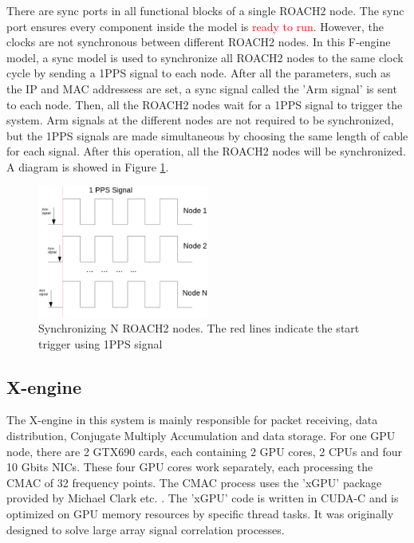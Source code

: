 \documentclass{ws-jai}
\begin{document}
        There are sync ports in all functional blocks of a single ROACH2 node. The sync port ensures every component inside the model is \textcolor{red}{ready to run}. However, the clocks are not synchronous between different ROACH2 nodes. In this F-engine model, a sync model is used to synchronize all ROACH2 nodes to the same clock cycle by sending a 1PPS signal to each node. After all the parameters, such as the IP and MAC addressess are set, a sync signal called the 'Arm signal' is sent to each node. Then, all the ROACH2 nodes wait for a 1PPS signal to trigger the system. Arm signals at the different nodes are not required to be synchronized, but the 1PPS signals are made simultaneous by choosing the same length of cable for each signal. After this operation, all the ROACH2 nodes will be synchronized. A diagram is showed in Figure \ref{fig:1pps}.
\begin{figure}[t]
 \centering
 \includegraphics[width=0.5\textwidth]{./picture/1pps_sync.eps}
\caption{Synchronizing N ROACH2 nodes. The red lines indicate the start trigger using 1PPS signal\label{fig:1pps}}
\end{figure}


\subsection{X-engine}\label{sec:X-engine}

The X-engine in this system is mainly responsible for packet receiving, data distribution, Conjugate Multiply Accumulation and data storage. For one GPU node, there are 2 GTX690 cards, each containing 2 GPU cores, 2 CPUs and four 10 Gbits NICs. These four GPU cores work separately, each processing the CMAC of 32 frequency points. The CMAC process uses the 'xGPU' package provided by Michael Clark etc. \cite{2013IJHPC..27..178C}. The 'xGPU' code is written in CUDA-C and is optimized on GPU memory resources by specific thread tasks. It was originally designed to solve large array signal correlation processes.
\end{document}
